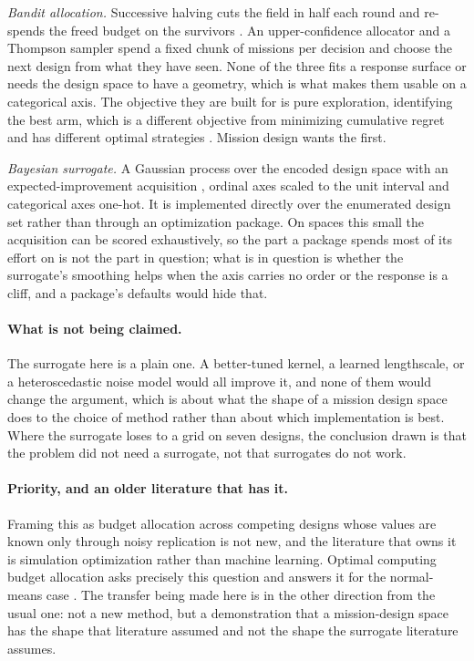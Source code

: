 \documentclass[11pt]{article}
\begin{document}
\emph{Bandit allocation.} Successive halving cuts the field in half each round and re-spends the
freed budget on the survivors \citep{karnin2013almost,jamieson2015nonstochastic}. An upper-confidence
allocator and a Thompson sampler spend a fixed chunk of missions per decision and choose the next
design from what they have seen. None of the three fits a response surface or needs the design space
to have a geometry, which is what makes them usable on a categorical axis. The objective they are
built for is pure exploration, identifying the best arm, which is a different objective from
minimizing cumulative regret and has different optimal strategies \citep{bubeck2011pure}. Mission
design wants the first.

\emph{Bayesian surrogate.} A Gaussian process over the encoded design space with an
expected-improvement acquisition \citep{brochu2010tutorial,shahriari2016taking}, ordinal axes scaled
to the unit interval and categorical axes one-hot. It is implemented directly over the enumerated
design set rather than through an optimization package. On spaces this small the acquisition can be
scored exhaustively, so the part a package spends most of its effort on is not the part in question;
what is in question is whether the surrogate's smoothing helps when the axis carries no order or the
response is a cliff, and a package's defaults would hide that.

\paragraph{What is not being claimed.} The surrogate here is a plain one. A better-tuned kernel, a
learned lengthscale, or a heteroscedastic noise model would all improve it, and none of them would
change the argument, which is about what the shape of a mission design space does to the choice of
method rather than about which implementation is best. Where the surrogate loses to a grid on seven
designs, the conclusion drawn is that the problem did not need a surrogate, not that surrogates do
not work.

\paragraph{Priority, and an older literature that has it.} Framing this as budget allocation across
competing designs whose values are known only through noisy replication is not new, and the
literature that owns it is simulation optimization rather than machine learning. Optimal computing
budget allocation asks precisely this question and answers it for the normal-means case
\citep{chen2000simulation}. The transfer being made here is in the other direction from the usual
one: not a new method, but a demonstration that a mission-design space has the shape that
literature assumed and not the shape the surrogate literature assumes.
\end{document}
